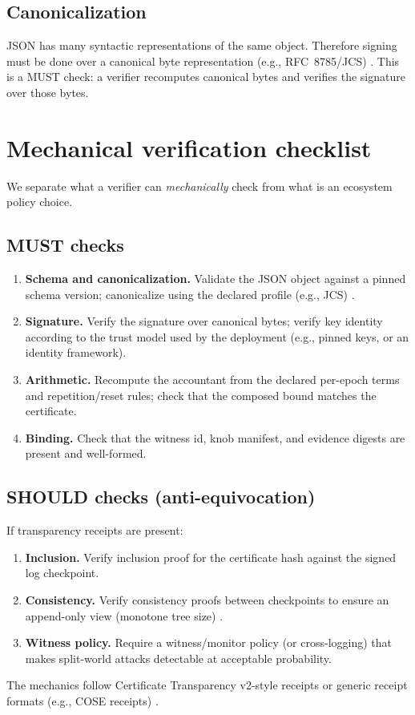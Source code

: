 \documentclass[11pt]{article}
\begin{document}
\subsection{Canonicalization}
JSON has many syntactic representations of the same object.
Therefore signing must be done over a canonical byte representation (e.g., RFC~8785/JCS) \cite{rfc8785}.
This is a MUST check: a verifier recomputes canonical bytes and verifies the signature over those bytes.

\section{Mechanical verification checklist}
We separate what a verifier can \emph{mechanically} check from what is an ecosystem policy choice.

\subsection{MUST checks}
\begin{enumerate}[leftmargin=1.6em]
\item \textbf{Schema and canonicalization.} Validate the JSON object against a pinned schema version; canonicalize using the declared profile (e.g., JCS) \cite{rfc8785}.
\item \textbf{Signature.} Verify the signature over canonical bytes; verify key identity according to the trust model used by the deployment (e.g., pinned keys, or an identity framework).
\item \textbf{Arithmetic.} Recompute the accountant from the declared per-epoch terms and repetition/reset rules; check that the composed bound matches the certificate.
\item \textbf{Binding.} Check that the witness id, knob manifest, and evidence digests are present and well-formed.
\end{enumerate}

\subsection{SHOULD checks (anti-equivocation)}
If transparency receipts are present:
\begin{enumerate}[leftmargin=1.6em]
\item \textbf{Inclusion.} Verify inclusion proof for the certificate hash against the signed log checkpoint.
\item \textbf{Consistency.} Verify consistency proofs between checkpoints to ensure an append-only view (monotone tree size) \cite{rfc9162}.
\item \textbf{Witness policy.} Require a witness/monitor policy (or cross-logging) that makes split-world attacks detectable at acceptable probability.
\end{enumerate}
The mechanics follow Certificate Transparency v2-style receipts \cite{rfc9162} or generic receipt formats (e.g., COSE receipts) \cite{cose_receipts_draft}.
\end{document}

